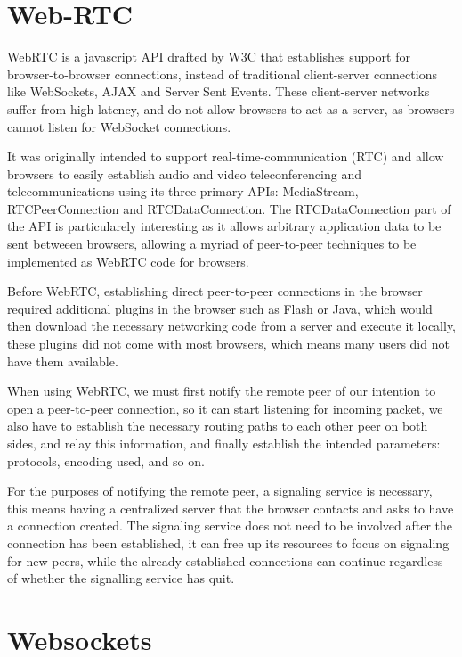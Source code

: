 \section{Web-RTC}
WebRTC is a javascript API drafted by W3C that establishes support for browser-to-browser connections,
instead of traditional client-server connections like WebSockets, AJAX and Server Sent Events.
These client-server networks suffer from high latency, and do not allow browsers to act as a server,
as browsers cannot listen for WebSocket connections.

It was originally intended to support real-time-communication (RTC) 
and allow browsers to easily establish audio and video teleconferencing and telecommunications
using its three primary APIs: MediaStream, RTCPeerConnection and RTCDataConnection.
The RTCDataConnection part of the API is particularely interesting
as it allows arbitrary application data to be sent betweeen browsers,
allowing a myriad of peer-to-peer techniques to be implemented as WebRTC code for browsers.

Before WebRTC, establishing direct peer-to-peer connections in the browser required
additional plugins in the browser such as Flash or Java, which would then download the necessary networking code
from a server and execute it locally,
these plugins did not come with most browsers,
which means many users did not have them available.
\newline

\label{webrtc-connection-server}
When using WebRTC, we must first notify the remote peer of our intention
to open a peer-to-peer connection, so it can start listening for incoming packet,
we also have to establish the necessary routing paths to each other peer on both sides,
and relay this information,
and finally establish the intended parameters: protocols, encoding used, and so on.

For the purposes of notifying the remote peer, a signaling service is necessary,
this means having a centralized server that the browser contacts and asks to have a connection created.
The signaling service does not need to be involved after the connection has been established,
it can free up its resources to focus on signaling for new peers, 
while the already established connections can continue regardless of whether the signalling service has quit.

\section{Websockets}


